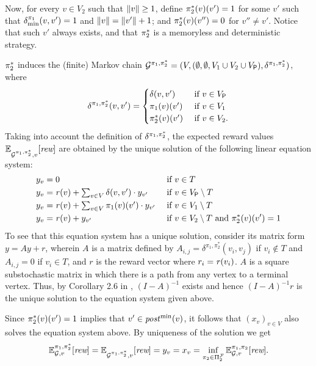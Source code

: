 \begin{myproof}
  Now,  for every $v\in V_2$
  such that ${\lVert{v}\rVert} \geq 1$, define $\pi^*_{2}(v)(v')=1$
  for some $v'$ such that $\delta^{\pi_{1}}_{\min}(v,v')=1$ and
  ${\lVert{v}\rVert}={\lVert{v'}\rVert}+1$; and $\pi^*_{2}(v)(v'')=0$ for $v''\neq v'$.  Notice that such $v'$ always exists,
  and that $\pi^*_{2}$ is a memoryless and deterministic
  strategy.

  $\pi^*_{2}$ induces the (finite) Markov chain
  $\mathcal{G}^{\pi_{1},\pi^*_{2}} = (V, (\emptyset,\emptyset,V_1\cup V_2\cup V_{\mathsf{P}}),\delta^{\pi_{1},\pi^*_{2}})$,
  where
  \[\delta^{\pi_{1},\pi^*_{2}}(v,v') =
    \begin{cases}
      \delta(v,v')     & \text{ if } v\in V_{\mathsf{P}} \\
      \pi_{1}(v)(v') & \text{ if } v\in V_1 \\
      \pi^*_{2}(v)(v') & \text{ if } v\in V_2.
    \end{cases}
  \]
  Taking into account the definition of $\delta^{\pi_{1},\pi^*_{2}}$,
  the expected reward values
  $\mathbb{E}^{}_{\mathcal{G}^{\pi_{1},\pi^*_{2}},v}[\textit{rew}]$ are obtained
  by the unique solution of the following linear equation system:
  \begin{align*}
    y_v = {} & 0 && \text{ if } v\in T \\
    y_v = {} &\textstyle \mathit{r}(v) + \sum_{v\in V} \delta(v,v') \cdot y_{v'} && \text{ if } v\in V_{\mathsf{P}} \setminus T\\
    y_v = {} &\textstyle \mathit{r}(v) + \sum_{v\in V} \pi_{1}(v)(v') \cdot y_{v'}  && \text{ if } v\in V_1 \setminus T\\
    y_v = {} & \mathit{r}(v) +  y_{v'} && \text{ if } v\in V_2 \setminus T \text{ and } \pi^*_{2}(v)(v') = 1
  \end{align*}
  To see that this equation system has a unique solution, consider its
  matrix form $y = Ay+ r$, wherein $A$ is a matrix defined by
  $A_{i,j} = \delta^{\pi_1,\pi^*_2}(v_i,v_j)$ if $v_i \notin T$ and
  $A_{i,j} = 0$ if $v_i \in T$, and $r$ is the reward vector where
  $r_i = \mathit{r}(v_i)$.
  $A$ is a square substochastic matrix
  \cite{DBLP:journals/moc/Azimzadeh19} in which there is a path from
  any vertex to a terminal vertex.
  Thus, by Corollary 2.6 in \cite{DBLP:journals/moc/Azimzadeh19},
  $(I-A)^{-1}$ exists and hence $(I-A)^{-1} r$ is the unique solution
  to the equation system given above.

  Since $\pi^*_{2}(v)(v') = 1$ implies that $v'\in\mathit{post}^{\min}(v)$,
  it follows that $(x_v)_{v\in V}$ also solves the equation system
  above.  By uniqueness of the solution we get
  \[\mathbb{E}^{\pi_{1}, \pi^*_{2}}_{\mathcal{G},v}[\textit{rew}] = 
    \mathbb{E}^{}_{\mathcal{G}^{\pi_{1},\pi^*_{2}},v}[\textit{rew}] =
    y_v = x_v =
    \inf_{\pi_{2} \in \Pi^{\mathcal{F}}_{2}} \mathbb{E}^{\pi_{1}, \pi_{2}}_{\mathcal{G},v}[\textit{rew}].
  \]


\end{myproof}
